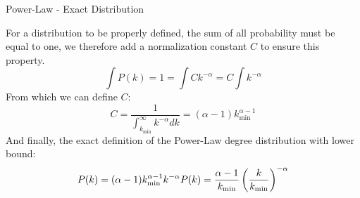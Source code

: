 \documentclass[a4paper,11pt]{book}
\begin{document}
\begin{textbox}{Power-Law - Exact Distribution}

For a distribution to be properly defined, the sum of all probability must be equal to one, we therefore add a normalization constant $C$ to ensure this property.
\[
\int P(k)=1= \int Ck^{-\alpha}=C\int k^{-\alpha}
\]
From which we can define $C$:
\[
C = \frac{1}{\int_{k_{\min}}^{\infty}k^{-\alpha} dk}=(\alpha-1)k_{\min}^{\alpha-1}
\]
And finally, the exact definition of the Power-Law degree distribution with lower bound:
\[
P(k) = (\alpha-1)k_{\min}^{\alpha-1}k^{-\alpha} \\
P(k) = \frac{\alpha-1}{k_{\min}}\left(\frac{k}{k_{\min}}\right)^{-\alpha}
\]

\end{textbox}
\end{document}

